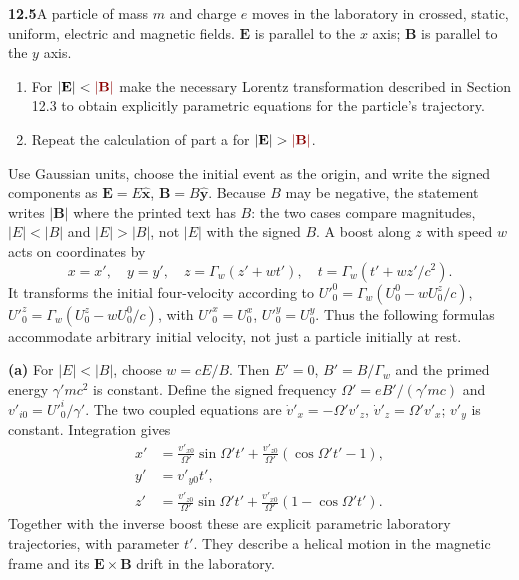 \par\bigskip
\noindent\textbf{12.5}\quad A particle of mass $m$ and charge $e$ moves in the laboratory in crossed, static, uniform, electric and magnetic fields. $\mathbf{E}$ is parallel to the $x$ axis; $\mathbf{B}$ is parallel to the $y$ axis.
\begin{enumerate}
\item[(a)] For $|\mathbf{E}|<\erratum{|\mathbf{B}|}$ make the necessary Lorentz transformation described in Section 12.3 to obtain explicitly parametric equations for the particle's trajectory.
\item[(b)] Repeat the calculation of part a for $|\mathbf{E}|>\erratum{|\mathbf{B}|}$.
\end{enumerate}
\solution

Use Gaussian units, choose the initial event as the origin, and
write the signed components as $\mathbf E=E\widehat{\mathbf x}$,
$\mathbf B=B\widehat{\mathbf y}$.  Because $B$ may be negative, the
statement writes $|\mathbf B|$ where the printed text has $B$: the two
cases compare magnitudes, $|E|<|B|$ and $|E|>|B|$, not $|E|$ with the
signed $B$.  A boost along $z$ with speed
$w$ acts on coordinates by
\[
x=x',\quad y=y',\quad z=\Gamma_w(z'+wt'),\quad
 t=\Gamma_w(t'+wz'/c^2).
\]
It transforms the initial four-velocity according to
$U'^0_0=\Gamma_w(U^0_0-wU^z_0/c)$,
$U'^z_0=\Gamma_w(U^z_0-wU^0_0/c)$, with $U'^x_0=U^x_0$,
$U'^y_0=U^y_0$.  Thus the following formulas accommodate arbitrary
initial velocity, not just a particle initially at rest.

\medskip\noindent\textbf{(a)} For $|E|<|B|$, choose $w=cE/B$.  Then
$E'=0$, $B'=B/\Gamma_w$ and the primed energy $\gamma'mc^2$
is constant.  Define the signed frequency
$\Omega'=eB'/(\gamma'mc)$ and $v'_{i0}=U'^i_0/\gamma'$.
The two coupled equations are
$\dot v'_x=-\Omega'v'_z$, $\dot v'_z=\Omega'v'_x$;
$v'_y$ is constant.  Integration gives
\begin{align*}
x'&=\frac{v'_{x0}}{\Omega'}\sin\Omega't'
 +\frac{v'_{z0}}{\Omega'}(\cos\Omega't'-1),\\
y'&=v'_{y0}t',\\
z'&=\frac{v'_{z0}}{\Omega'}\sin\Omega't'
 +\frac{v'_{x0}}{\Omega'}(1-\cos\Omega't').
\end{align*}
Together with the inverse boost these are explicit parametric
laboratory trajectories, with parameter $t'$.  They describe a
helical motion in the magnetic frame and its $\mathbf E\times\mathbf B$
drift in the laboratory.

